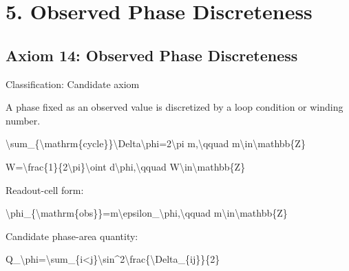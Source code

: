 \documentclass[
  a4paper]{article}
\newenvironment{Shaded}{}{}
\newcommand{\NormalTok}[1]{#1}
\begin{document}
\section{5. Observed Phase
Discreteness}\label{observed-phase-discreteness}

\subsection{Axiom 14: Observed Phase
Discreteness}\label{axiom-14-observed-phase-discreteness}

Classification: Candidate axiom

A phase fixed as an observed value is discretized by a loop condition or
winding number.

\begin{Shaded}
\begin{Highlighting}[]
\NormalTok{\textbackslash{}sum\_\{\textbackslash{}mathrm\{cycle\}\}\textbackslash{}Delta\textbackslash{}phi=2\textbackslash{}pi m,\textbackslash{}qquad m\textbackslash{}in\textbackslash{}mathbb\{Z\}}
\end{Highlighting}
\end{Shaded}

\begin{Shaded}
\begin{Highlighting}[]
\NormalTok{W=\textbackslash{}frac\{1\}\{2\textbackslash{}pi\}\textbackslash{}oint d\textbackslash{}phi,\textbackslash{}qquad W\textbackslash{}in\textbackslash{}mathbb\{Z\}}
\end{Highlighting}
\end{Shaded}

Readout-cell form:

\begin{Shaded}
\begin{Highlighting}[]
\NormalTok{\textbackslash{}phi\_\{\textbackslash{}mathrm\{obs\}\}=m\textbackslash{}epsilon\_\textbackslash{}phi,\textbackslash{}qquad m\textbackslash{}in\textbackslash{}mathbb\{Z\}}
\end{Highlighting}
\end{Shaded}

Candidate phase-area quantity:

\begin{Shaded}
\begin{Highlighting}[]
\NormalTok{Q\_\textbackslash{}phi=\textbackslash{}sum\_\{i\textless{}j\}\textbackslash{}sin\^{}2\textbackslash{}frac\{\textbackslash{}Delta\_\{ij\}\}\{2\}}
\end{Highlighting}
\end{Shaded}
\end{document}
